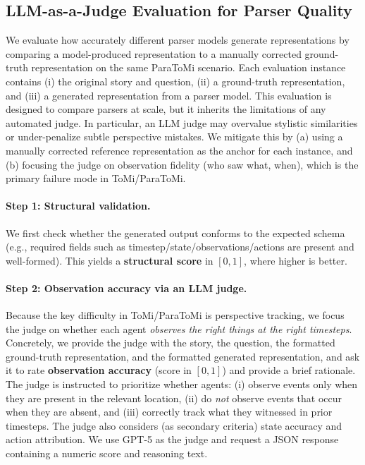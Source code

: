 \subsection{LLM-as-a-Judge Evaluation for \protocolname Parser Quality}
\label{app:parser_quality}
We evaluate how accurately different parser models generate \protocolname representations by comparing a model-produced representation to a manually corrected ground-truth representation on the same ParaToMi scenario. Each evaluation instance contains (i) the original story and question, (ii) a ground-truth \protocolname representation, and (iii) a generated \protocolname representation from a parser model.
This evaluation is designed to compare parsers at scale, but it inherits the limitations of any automated judge. In particular, an LLM judge may overvalue stylistic similarities or under-penalize subtle perspective mistakes. We mitigate this by (a) using a manually corrected reference representation as the anchor for each instance, and (b) focusing the judge on observation fidelity (who saw what, when), which is the primary failure mode in ToMi/ParaToMi.

\paragraph{Step 1: Structural validation.}
We first check whether the generated \protocolname output conforms to the expected schema (e.g., required fields such as timestep/state/observations/actions are present and well-formed). This yields a \textbf{structural score} in $[0,1]$, where higher is better.

\paragraph{Step 2: Observation accuracy via an LLM judge.}
Because the key difficulty in ToMi/ParaToMi is perspective tracking, we focus the judge on whether each agent \emph{observes the right things at the right timesteps}. Concretely, we provide the judge with the story, the question, the formatted ground-truth \protocolname representation, and the formatted generated representation, and ask it to rate \textbf{observation accuracy} (score in $[0,1]$) and provide a brief rationale.
The judge is instructed to prioritize whether agents:
(i) observe events only when they are present in the relevant location,
(ii) do \emph{not} observe events that occur when they are absent,
and (iii) correctly track what they witnessed in prior timesteps.
The judge also considers (as secondary criteria) state accuracy and action attribution.
We use GPT-5 as the judge and request a JSON response containing a numeric score and reasoning text.

